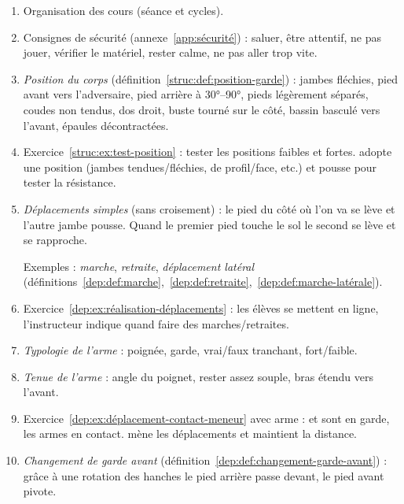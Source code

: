 \begin{enumerate}
	\item Organisation des cours (séance et cycles).

	\item Consignes de sécurité (annexe~\ref{app:sécurité}) : saluer, être attentif, ne pas jouer, vérifier le matériel, rester calme, ne pas aller trop vite.
	
	\item \emph{Position du corps} (définition~\ref{struc:def:position-garde}) : jambes fléchies, pied avant vers l'adversaire, pied arrière à \ang{30}--\ang{90}, pieds légèrement séparés, coudes non tendus, dos droit, buste tourné sur le côté, bassin basculé vers l'avant, épaules décontractées.
	
	\item Exercice~\ref{struc:ex:test-position} : tester les positions faibles et fortes.
	\D adopte une position (jambes tendues/fléchies, de profil/face, etc.) et \A pousse pour tester la résistance.
	
	\item \emph{Déplacements simples} (sans croisement) : le pied du côté où l'on va se lève et l'autre jambe pousse.
	Quand le premier pied touche le sol le second se lève et se rapproche.
	
	Exemples : \emph{marche}, \emph{retraite}, \emph{déplacement latéral} (définitions~\ref{dep:def:marche},~\ref{dep:def:retraite},~\ref{dep:def:marche-latérale}).
	
	\item Exercice~\ref{dep:ex:réalisation-déplacements} : les élèves se mettent en ligne, l'instructeur indique quand faire des marches/retraites.

	\item \emph{Typologie de l'arme} : poignée, garde, vrai/faux tranchant, fort/faible.
	
	\item \emph{Tenue de l'arme} : angle du poignet, rester assez souple, bras étendu vers l'avant.
	
	\item Exercice~\ref{dep:ex:déplacement-contact-meneur} avec arme : \A et \D sont en garde, les armes en contact.
	\A mène les déplacements et \D maintient la distance.
	
	\item \emph{Changement de garde avant} (définition~\ref{dep:def:changement-garde-avant}) : grâce à une rotation des hanches le pied arrière passe devant, le pied avant pivote.
	

\end{enumerate}
